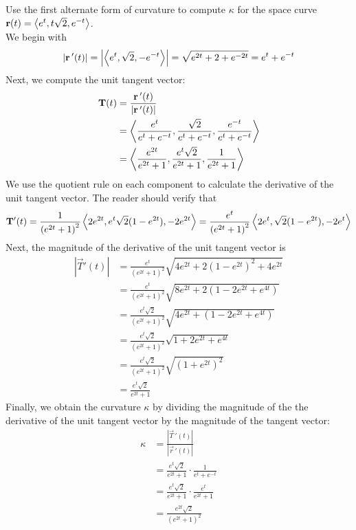 \documentclass[handout]{ximera}
\begin{document}
\begin{example}[Example 4]
Use the first alternate form of curvature to compute $\kappa$ for the space curve $\mathbf r(t) = \left\langle e^t, t\sqrt 2 , e^{-t}\right\rangle$.\\
We begin with
\[
|\mathbf r\,'(t)| = \left|\left\langle e^t, \sqrt 2 , -e^{-t}\right\rangle\right| = \sqrt{e^{2t} + 2 + e^{-2t}} = e^t + e^{-t}
\]
Next, we compute the unit tangent vector:
\begin{align*}
\mathbf T(t) &= \frac{\mathbf r\,'(t)}{|\mathbf r\,'(t)|}\\
             &= \left\langle \frac{e^t}{e^t + e^{-t}}, \frac{\sqrt 2}{e^t + e^{-t}} , \frac{e^{-t}}{e^t + e^{-t}}\right\rangle\\
             &= \left\langle \frac{e^{2t}}{e^{2t} + 1}, \frac{e^t\sqrt 2}{e^{2t} + 1} , \frac{1}{e^{2t} + 1}\right\rangle\\
\end{align*}
We use the quotient rule on each component to calculate the derivative of the unit tangent vector. The reader should verify that
\[
\mathbf T'(t) = \frac{1}{\left(e^{2t} +1\right)^2} \left\langle 2e^{2t}, e^t\sqrt 2 (1 - e^{2t}), -2e^{2t}\right\rangle = \frac{e^t}{\left(e^{2t} +1\right)^2} \left\langle 2e^{t}, \sqrt 2 (1 - e^{2t}), -2e^{t}\right\rangle
\]
Next, the magnitude of the derivative of the unit tangent vector is
\begin{align*}
\left|\vec T'(t)\right| &= \frac{e^t}{\left(e^{2t} +1\right)^2} \sqrt{4e^{2t} + 2 (1 - e^{2t})^2 + 4e^{2t}}\\
          &= \frac{e^t}{\left(e^{2t} +1\right)^2} \sqrt{8e^{2t} + 2 (1 -2e^{2t}+ e^{4t})}\\
        &= \frac{e^t \sqrt 2}{\left(e^{2t} +1\right)^2} \sqrt{4e^{2t} +  (1 -2e^{2t}+ e^{4t})}\\
          &= \frac{e^t \sqrt 2}{\left(e^{2t} +1\right)^2} \sqrt{1 +2e^{2t}+ e^{4t}}\\
          &= \frac{e^t \sqrt 2}{\left(e^{2t} +1\right)^2} \sqrt{(1 +e^{2t})^2}\\
            &= \frac{e^t \sqrt 2}{e^{2t} +1}
\end{align*}
Finally, we obtain the curvature $\kappa$ by dividing the magnitude of the the derivative of the unit tangent vector by the magnitude of the tangent vector:
\begin{align*}
\kappa &= \frac{|\vec T\,'(t)|}{|\vec r\,'(t)|}\\
       &= \frac{e^t \sqrt 2}{e^{2t} +1} \cdot \frac{1}{e^t + e^{-t}}\\
      &= \frac{e^t \sqrt 2}{e^{2t} +1} \cdot \frac{e^t}{e^{2t} + 1}\\
     &= \frac{e^{2t} \sqrt 2}{\left(e^{2t} +1\right)^2}
\end{align*}
\end{example}
\end{document}
